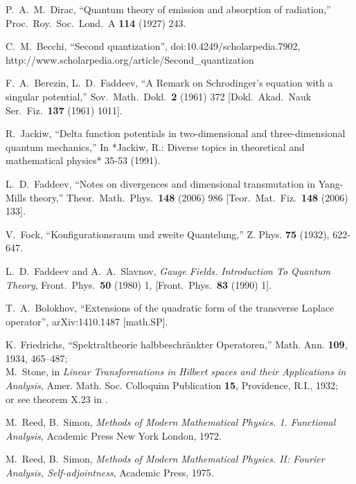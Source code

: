 \documentclass[12pt]{article}
\begin{document}
\begin{thebibliography}{0}

P.~A.~M.~Dirac,
``Quantum theory of emission and absorption of radiation,''
Proc.\ Roy.\ Soc.\ Lond.\ A {\bf 114} (1927) 243.

C.~M.~Becchi,
``Second quantization'', doi:10.4249/scholarpedia.7902,
http://www.scholarpedia.org/article/Second\_quantization

    F.~A.~Berezin, L.~D.~Faddeev,
  ``A Remark on Schrodinger's equation with a singular potential,''
  Sov.\ Math.\ Dokl.\  {\bf 2} (1961) 372
  [Dokl.\ Akad.\ Nauk Ser.\ Fiz.\  {\bf 137} (1961) 1011].

  R.~Jackiw,
  ``Delta function potentials in two-dimensional and three-dimensional
  quantum mechanics,''
  In *Jackiw, R.: Diverse topics in theoretical and mathematical physics*
  35-53 (1991).

L.~D.~Faddeev,
``Notes on divergences and dimensional transmutation in Yang-Mills theory,''
Theor.\ Math.\ Phys.\  {\bf 148} (2006) 986
[Teor.\ Mat.\ Fiz.\  {\bf 148} (2006) 133].

V.~Fock, ``Konfigurationsraum und zweite Quantelung,''
Z. Phys. {\bf 75} (1932), 622-647.

  L.~D.~Faddeev and A.~A.~Slavnov,
\emph{Gauge Fields. Introduction To Quantum Theory},
Front.\ Phys.\  {\bf 50} (1980) 1, [Front.\ Phys.\  {\bf 83} (1990) 1].

 T.~A.~Bolokhov,
``Extensions of the quadratic form of the transverse Laplace operator'',
arXiv:1410.1487 [math.SP].

    K.~Friedrichs, ``Spektraltheorie halbbeschr\"ankter Operatoren,''
    Math. Ann. {\bf 109}, 1934, 465--487;\\
    M.~Stone, in \emph{Linear Transformations in Hilbert spaces and their
    Applications in Analysis}, Amer. Math. Soc. Colloquim Publication {\bf 15},
    Providence, R.I., 1932;\\
    or see theorem X.23 in \cite{RS2}.

  M.~Reed, B.~Simon, \emph{Methods of Modern Mathematical
Physics. 1. Functional Analysis}, Academic Press New York London, 1972.

 M.~Reed, B.~Simon, \emph{Methods of Modern Mathematical Physics.
II: Fourier Analysis, Self-adjointness}, Academic Press, 1975.


\end{thebibliography}
\end{document}
